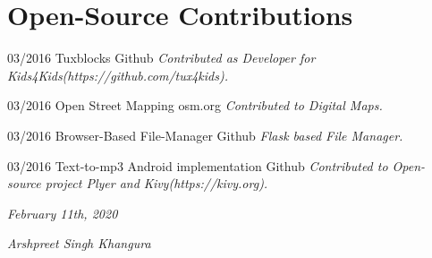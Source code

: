 \documentclass[]{friggeri-cv}
\begin{document}
\section{Open-Source Contributions}
\begin{entrylist}
 \entry
    {03/2016}
    {Tuxblocks}
    {Github}
    {\emph{Contributed as Developer for Kids4Kids(https://github.com/tux4kids).}}

 \entry
    {03/2016}
    {Open Street Mapping}
    {osm.org}
    {\emph{Contributed to Digital Maps.}}

 \entry
    {03/2016}
    {Browser-Based File-Manager}
    {Github}
    {\emph{Flask based File Manager.}}

 \entry
    {03/2016}
    {Text-to-mp3 Android implementation}
    {Github}
    {\emph{Contributed to Open-source project Plyer and Kivy(https://kivy.org).}}

\end{entrylist}
\begin{flushleft}
\emph{February 11th, 2020}
\end{flushleft}
\begin{flushright}
\emph{Arshpreet Singh Khangura}
\end{flushright}
\clearpage
\end{document}
